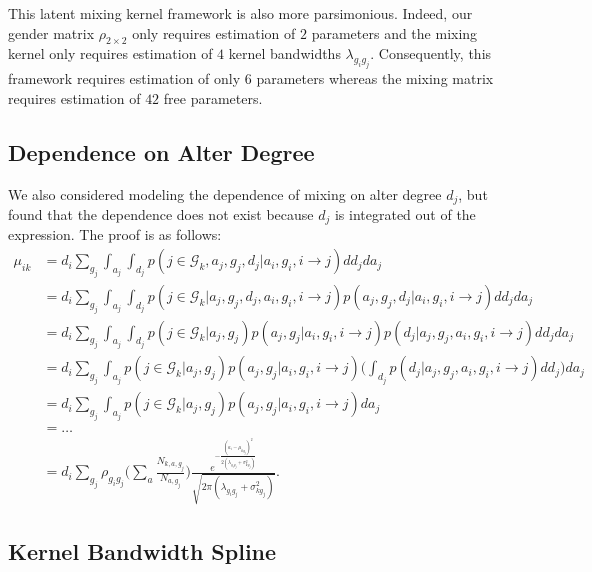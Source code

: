 This latent mixing kernel framework is also more parsimonious. Indeed, our gender matrix $\rho_{2\times2}$ only requires estimation of $2$ parameters and the mixing kernel only requires estimation of $4$ kernel bandwidths $\lambda_{g_ig_j}$. Consequently, this framework requires estimation of only $6$ parameters whereas the \citet{McCormick+others:2010} mixing matrix requires estimation of $42$ free parameters.

\subsection{Dependence on Alter Degree}
\label{subsec:alter_age_dependence}

We also considered modeling the dependence of mixing on alter degree $d_j$, but found that the dependence does not exist because $d_j$ is integrated out of the expression. The proof is as follows:
\begin{align}
\mu_{ik} 
&= d_i \sum_{g_j} \int_{a_j} \int_{d_j} p( j \in \mathcal{G}_k, a_j, g_j, d_j | a_i, g_i, i \to j) dd_j da_j && \\\nonumber
&= d_i \sum_{g_j} \int_{a_j} \int_{d_j} p( j \in \mathcal{G}_k | a_j, g_j, d_j, a_i, g_i, i \to j) p(a_j, g_j, d_j | a_i, g_i, i \to j)  dd_j da_j && \\\nonumber
&= d_i \sum_{g_j} \int_{a_j} \int_{d_j} p( j \in \mathcal{G}_k | a_j, g_j) p(a_j, g_j | a_i, g_i, i \to j) p(d_j | a_j, g_j, a_i, g_i, i \to j) 
 dd_j da_j && \\\nonumber
&= d_i \sum_{g_j} \int_{a_j}  p( j \in \mathcal{G}_k | a_j, g_j) p(a_j, g_j | a_i, g_i, i \to j) 
\biggl( \int_{d_j}  p(d_j | a_j, g_j, a_i, g_i, i \to j) dd_j \biggr) da_j && \\\nonumber
&= d_i \sum_{g_j} \int_{a_j}  p( j \in \mathcal{G}_k | a_j, g_j)  p(a_j, g_j | a_i, g_i, i \to j)  da_j && \\\nonumber
&= \dots && \\\nonumber
&= d_i \sum_{g_j} \rho_{g_ig_j} 
\biggl( \sum_{a} \frac{ N_{k, a, g_j} }{ N_{a, g_j} } \biggr) 
\frac{ e^{ -\frac{ (a_i - \mu_{kg_j})^2 }{ 2(\lambda_{g_ig_j} + \sigma_{kg_j}^2) } } }{ \sqrt{ 2\pi(\lambda_{g_ig_j} + \sigma_{kg_j}^2) } }.
\end{align}

\subsection{Kernel Bandwidth Spline}
\label{subsec:kernel_bandwidth_spline}


